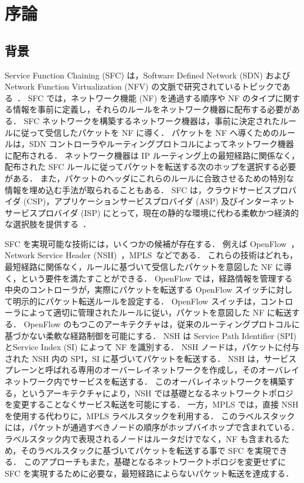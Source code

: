 \chapter{序論}
\label{chap:introduction}

\section{背景}
\label{section:background}
Service Function Chaining (SFC) は，Software Defined Network (SDN) および Network Function Virtualization (NFV) の文脈で研究されているトピックである~\cite{nfv,sfc-on-sdn-nfv-servey,sfc-on-sdn-scenario,imple-sfc-with-openflow}．
SFC では，ネットワーク機能 (NF) を通過する順序や NF のタイプに関する情報を事前に定義し，それらのルールをネットワーク機器に配布する必要がある．
SFC ネットワークを構築するネットワーク機器は，事前に決定されたルールに従って受信したパケットを NF に導く．
パケットを NF へ導くためのルールは，SDN コントローラやルーティングプロトコルによってネットワーク機器に配布される．
ネットワーク機器は IP ルーティング上の最短経路に関係なく，配布された SFC ルールに従ってパケットを転送する次のホップを選択する必要がある．
また，パケットのヘッダにこれらのルールに合致させるための特別な情報を埋め込む手法が取られることもある．
SFC は，クラウドサービスプロバイダ (CSP)，アプリケーションサービスプロバイダ (ASP) 及びインターネットサービスプロバイダ (ISP) にとって，現在の静的な環境に代わる柔軟かつ経済的な選択肢を提供する~\cite{survey-on-sfc}．

SFC を実現可能な技術には，いくつかの候補が存在する．
例えば OpenFlow~\cite{openflow}，Network Service Header (NSH)~\cite{rfc8300}，\fussy MPLS~\cite{rfc8595}などである．
これらの技術はどれも，最短経路に関係なく，ルールに基づいて受信したパケットを意図した NF に導く，という要件を満たすことができる．
OpenFlow では，経路情報を管理する中央のコントローラが，実際にパケットを転送する OpenFlow スイッチに対して明示的にパケット転送ルールを設定する．
OpenFlow スイッチは，コントローラによって適切に管理されたルールに従い，パケットを意図した NF に転送する．
OpenFlow のもつこのアーキテクチャは，従来のルーティングプロトコルに基づかない柔軟な経路制御を可能にする．
NSH は Service Path Identifier (SPI) とService Index (SI) によって NF を識別する．
NSH ノードは，パケットに付与された NSH 内の SPI，SI に基づいてパケットを転送する．
NSH は，サービスプレーンと呼ばれる専用のオーバーレイネットワークを作成し，そのオーバレイネットワーク内でサービスを転送する．
このオーバレイネットワークを構築する，というアーキテクチャにより，NSH では基礎となるネットワークトポロジを変更することなくサービス転送を可能にする．
一方，MPLS では，直接 NSH を使用する代わりに，MPLS ラベルスタックを利用する．
このラベルスタックには，パケットが通過すべきノードの順序がホップバイホップで含まれている．
ラベルスタック内で表現されるノードはルータだけでなく，NF も含まれるため，そのラベルスタックに基づいてパケットを転送する事で SFC を実現できる．
このアプローチもまた，基礎となるネットワークトポロジを変更せずに SFC を実現するために必要な，最短経路によらないパケット転送を達成する．

